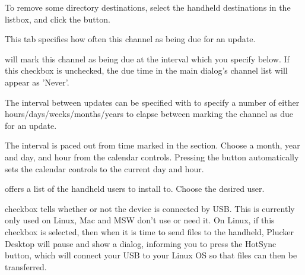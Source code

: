 To remove some directory destinations, select the handheld destinations in the listbox,
and click the  button.


This tab specifies how often this channel as being due for an update.

 will 
mark this channel as being due at the interval which you specify below. If 
this checkbox is unchecked, the due time in the main dialog's channel list 
will appear as 'Never'.

The interval between updates can be specified with
 to specify a 
number of either hours/days/weeks/months/years to elapse between marking the 
channel as due for an update.

The interval is paced out from time marked in the 
section. Choose a month, year and day, and hour from the calendar controls.
Pressing the  button automatically sets the calendar
controls to the current day and hour.


 offers a list of the handheld users to install to. 
Choose the desired user.

 checkbox tells whether or not the 
device is connected by USB. This is currently only used on Linux, Mac and MSW don't 
use or need it. On Linux, if this checkbox is selected, then when it is time to 
send files to the handheld, Plucker Desktop will pause and show a dialog, informing 
you to press the HotSync button, which will connect your USB to your Linux OS so that 
files can then be transferred.

